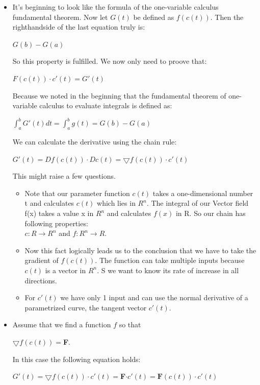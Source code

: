 \documentclass[12pt,a4paper]{article}
\begin{document}
\begin{itemize}
		\item It's beginning to look like the formula of the one-variable calculus fundamental theorem. Now let $G(t)$ be defined as $f(c(t))$. Then the righthandside of the last equation truly is: 
		\begin{center}
			$G(b)-G(a)$
		\end{center}So this property is fulfilled. We now only need to proove that: 
		\begin{center}
			$F(c(t)) \cdot c'(t) = G'(t)$
		\end{center}
		Because we noted in the beginning that the fundamental theorem of one-variable calculus to evaluate integrals is defined as:
		\begin{center}
			$\int_{a}^{b} G'(t) dt =\int_{a}^{b} g(t) = G(b) - G(a)$
		\end{center}
		We can calculate the derivative using the chain rule:\\
		\begin{center}
			$G'(t) = Df(c(t))\cdot Dc(t) = \bigtriangledown f(c(t))\cdot c'(t)$
		\end{center}
		This might raise a few questions. 
		 \begin{itemize}
				\item Note that our parameter function $c(t)$ takes a one-dimensional number t and calculates $c(t)$ which lies in $R^n$. The integral of our Vector field f(x) takes a value x in $R^n$ and calculates $f(x)$ in R. So our chain has following properties: \\
		$c: R \rightarrow R^n$ and $f: R^n \rightarrow R$. 
			\item Now this fact logically leads us to the conclusion that we have to take the gradient of $f(c(t))$. The function can take multiple inputs because $c(t)$ is a vector in $R^n$. S we want to know its rate of increase in all directions. 
			\item For $c'(t)$ we have only 1 input and can use the normal derivative of a parametrized curve, the tangent vector $c'(t)$. 
		\end{itemize}
		
		\item Assume that we find a function $f$ so that  \begin{center} $\bigtriangledown f(c(t)) = $\textbf{F}.
		\end{center}
		In this case the following equation holds: 
		\begin{center}
			$G'(t) = \bigtriangledown f(c(t)) \cdot c'(t) = $\textbf{F}$ \cdot c'(t) = \textbf{F}(c(t))\cdot c'(t)$
		\end{center}
		

\end{itemize}
\end{document}

